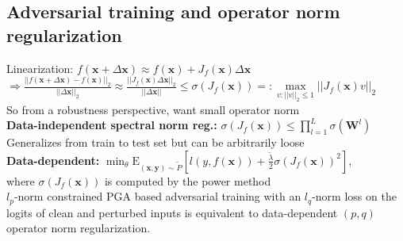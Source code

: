 \subsection*{Adversarial training and operator norm regularization}
Linearization: $f(\mathbf x+\Delta\mathbf x)\approx f(\mathbf x)+J_f(\mathbf x)\Delta\mathbf x$\\
$\Rightarrow \frac{||f(\mathbf x+\Delta\mathbf x)-f(\mathbf x)||_2}{||\Delta\mathbf x||_2}\approx\frac{||J_f(\mathbf x)\Delta\mathbf x||_2}{||\Delta\mathbf x||}\leq \sigma(J_f(\mathbf x))=:\underset{v:||v||_2\leq 1}{\max}||J_f(\mathbf x)v||_2$\\
So from a robustness perspective, want small operator norm\\
\textbf{Data-independent spectral norm reg.:} $\sigma(J_f(\mathbf x))\leq\prod_{l=1}^L\sigma(\mathbf W^l)$\\
Generalizes from train to test set but can be arbitrarily loose\\
\textbf{Data-dependent:} $\min_\theta\mathrm E_{(\mathbf x,\mathbf y)\sim\tilde P}[l(y,f(\mathbf x))+ \frac{\tilde\lambda}{2}\sigma(J_f(\mathbf x))^2]$,\\ where $\sigma(J_f(\mathbf x))$ is computed by the power method\\
$l_p$-norm constrained PGA based adversarial training with an $l_q$-norm loss on the logits of clean and perturbed inputs is equivalent to data-dependent $(p, q)$ operator norm regularization.